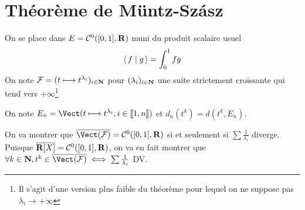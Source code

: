 \section{Théorème de Müntz-Szász}

On se place dans $E=\mathcal  C^0([0, 1], \mathbf R)$ muni du produit scalaire usuel \[
\scalar{f}{g} =\int_0^1fg
\] 
On note $\mathcal  F=(t \longmapsto t^{\lambda_i})_{i \in  \mathbf N}$ pour $(\lambda_i)_{i \in  \mathbf N}$ une suite strictement croissante qui tend vers $+\infty$\footnote{Il s'agit d'une version plus faible du théorème pour lequel on ne suppose pas $\lambda_i \to  +\infty$}

On note $E_n=\Vect(t\longmapsto t^{\lambda_i}, i \in  \llbracket 1, n \rrbracket )$ et $d_n(t^k)=d(t^k,E_n)$.

On va montrer que $\bar{\Vect(\mathcal  F)}=\mathcal  C^0([0, 1], \R)$ si et seulement si $\sum\frac{1}{\lambda_i}$ diverge. Puisque $\overline{\mathbf R[X]}=\mathcal  C^0([0, 1], \mathbf R)$, on va en fait montrer que $\forall  k \in \N, t^k \in  \bar{\Vect(\mathcal  F)} \iff  \sum \frac{1}{\lambda_i}$ DV.


